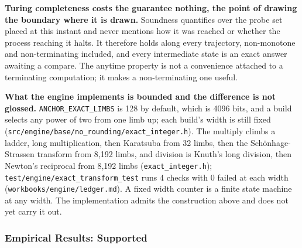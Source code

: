 \textbf{Turing completeness costs the guarantee nothing, the point of drawing the boundary where it is drawn.} Soundness quantifies over the probe set placed at this instant and never mentions how it was reached or whether the process reaching it halts. It therefore holds along every trajectory, non-monotone and non-terminating included, and every intermediate state is an exact answer awaiting a compare. The anytime property is not a convenience attached to a terminating computation; it makes a non-terminating one useful.

\textbf{What the engine implements is bounded and the difference is not glossed.} \texttt{ANCHOR\_EXACT\_LIMBS} is 128 by default, which is 4096 bits, and a build selects any power of two from one limb up; each build's width is still fixed (\texttt{src/\allowbreak{}engine/\allowbreak{}base/\allowbreak{}no\_rounding/\allowbreak{}exact\_integer.h}). The multiply climbs a ladder, long multiplication, then Karatsuba from 32 limbs, then the Schönhage-Strassen transform from 8,192 limbs, and division is Knuth's long division, then Newton's reciprocal from 8,192 limbs (\texttt{exact\_integer.h}); \texttt{test/\allowbreak{}engine/\allowbreak{}exact\_transform\_test} runs 4 checks with 0 failed at each width (\texttt{workbooks/\allowbreak{}engine/\allowbreak{}ledger.md}). A fixed width counter is a finite state machine at any width. The implementation admits the construction above and does not yet carry it out.

\subsubsection{Empirical Results: Supported}

